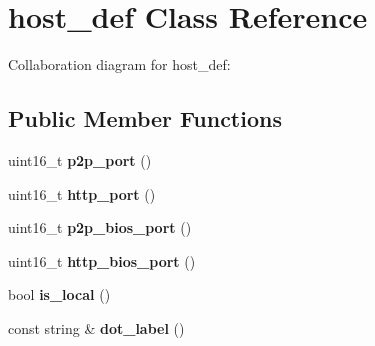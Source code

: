 \hypertarget{classhost__def}{}\section{host\+\_\+def Class Reference}
\label{classhost__def}


Collaboration diagram for host\+\_\+def\+:
\subsection*{Public Member Functions}
\begin{DoxyCompactItemize}
\item 
\mbox{\label{classhost__def_a49d47ba5ca76ad18b09ca32901531635}} 
uint16\+\_\+t {\bfseries p2p\+\_\+port} ()
\item 
\mbox{\label{classhost__def_a17cffb6914e7a4043c61edad887d6fd5}} 
uint16\+\_\+t {\bfseries http\+\_\+port} ()
\item 
\mbox{\label{classhost__def_a07bacf8fc3c2ad46a12dd118fc65afdc}} 
uint16\+\_\+t {\bfseries p2p\+\_\+bios\+\_\+port} ()
\item 
\mbox{\label{classhost__def_af4b3afa70decb059df5b4e936b361fba}} 
uint16\+\_\+t {\bfseries http\+\_\+bios\+\_\+port} ()
\item 
\mbox{\label{classhost__def_aa9a65f250197c9655bdc702b92ede809}} 
bool {\bfseries is\+\_\+local} ()
\item 
\mbox{\label{classhost__def_abeb1f774a7edb9fe09d9cda04e2a856a}} 
const string \& {\bfseries dot\+\_\+label} ()
\end{DoxyCompactItemize}
